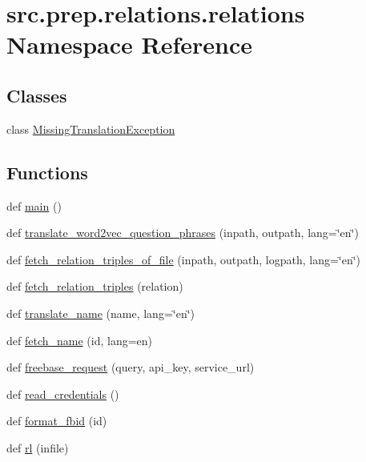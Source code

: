 \hypertarget{namespacesrc_1_1prep_1_1relations_1_1relations}{}\section{src.\+prep.\+relations.\+relations Namespace Reference}
\label{namespacesrc_1_1prep_1_1relations_1_1relations}
\subsection*{Classes}
\begin{DoxyCompactItemize}
\item 
class \hyperlink{classsrc_1_1prep_1_1relations_1_1relations_1_1_missing_translation_exception}{Missing\+Translation\+Exception}
\end{DoxyCompactItemize}
\subsection*{Functions}
\begin{DoxyCompactItemize}
\item 
def \hyperlink{namespacesrc_1_1prep_1_1relations_1_1relations_a92cf58bd0a3d202fe31142fe4fe8f492}{main} ()
\item 
def \hyperlink{namespacesrc_1_1prep_1_1relations_1_1relations_a58196f7d8122877a7ba116e1792d9731}{translate\+\_\+word2vec\+\_\+question\+\_\+phrases} (inpath, outpath, lang=\char`\"{}en\char`\"{})
\item 
def \hyperlink{namespacesrc_1_1prep_1_1relations_1_1relations_a1c981a2c3f9b0b27b4b4c696507f63fa}{fetch\+\_\+relation\+\_\+triples\+\_\+of\+\_\+file} (inpath, outpath, logpath, lang=\char`\"{}en\char`\"{})
\item 
def \hyperlink{namespacesrc_1_1prep_1_1relations_1_1relations_ae509b3eac41b71740683a5a76b015de7}{fetch\+\_\+relation\+\_\+triples} (relation)
\item 
def \hyperlink{namespacesrc_1_1prep_1_1relations_1_1relations_adda19af1b495da900604818a8aedc305}{translate\+\_\+name} (name, lang=\char`\"{}en\char`\"{})
\item 
def \hyperlink{namespacesrc_1_1prep_1_1relations_1_1relations_a3b5a6ee7e016c4af9815724387690e06}{fetch\+\_\+name} (id, lang=\textquotesingle{}en\textquotesingle{})
\item 
def \hyperlink{namespacesrc_1_1prep_1_1relations_1_1relations_a3d9c9155b30a5e777d42aa9b11e1df94}{freebase\+\_\+request} (query, api\+\_\+key, service\+\_\+url)
\item 
def \hyperlink{namespacesrc_1_1prep_1_1relations_1_1relations_a6a8d9a4d742c497fb7c81c2a7c59f5ed}{read\+\_\+credentials} ()
\item 
def \hyperlink{namespacesrc_1_1prep_1_1relations_1_1relations_aa0c0706cf46452b56803613372056491}{format\+\_\+fbid} (id)
\item 
def \hyperlink{namespacesrc_1_1prep_1_1relations_1_1relations_a439911c66e23b6d5a8feaf16665efd85}{rl} (infile)
\end{DoxyCompactItemize}



